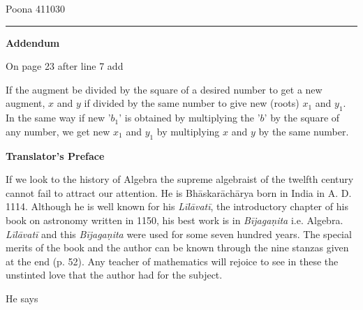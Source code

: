 \documentclass[]{article}
\begin{document}
{Poona 411030}

\begin{center}\rule{1\linewidth}{1.75pt}\end{center}
\vspace{10pt}
\begin{center}
    

\textbf{Addendum}

{On page 23 after line 7 add \textendash}
\end{center}

\begin{quote}

{
}
\end{quote}

If the augment be divided by the square of a desired number to get a
new augment, $x$ and $y$ if divided by the same number to give new (roots)
$x_{1}$ and $y_{1}$. In the same way if new '$b_{1}$' is obtained by
multiplying the '$b$' by the square of any number, we get new $x_{1}$ and
$y_{1}$ by multiplying $x$ and $y$ by the same number.
\newpage
\thispagestyle{empty}

\large
\textbf{Translator's Preface}
\vspace{2mm}

If we look to the history of Algebra the supreme algebraist of the twelfth century cannot fail to attract our attention. He is Bhāskarāchārya born in India in A. D. 1114. Although he is well known for his \textit{Līlāvatī}, the introductory chapter of his book on astronomy written in 1150, his best work is in \textit{Bījagaṇita} i.e. Algebra. \textit{Līlāvatī} and this \textit{Bījagaṇita} were used for some seven hundred years. The special merits of the book and the author can be known through the nine stanzas given at the end (p. 52). Any teacher of mathematics will rejoice to see in these the unstinted love that the author had for the subject.

He says

\begin{quote}  {}
\end{quote}
\end{document}
